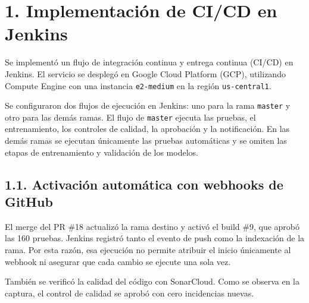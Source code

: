 \section{1. Implementación de CI/CD en Jenkins}

Se implementó un flujo de integración continua y entrega continua (CI/CD) en Jenkins. El servicio se desplegó en Google Cloud Platform (GCP), utilizando Compute Engine con una instancia \texttt{e2-medium} en la región \texttt{us-central1}.



Se configuraron dos flujos de ejecución en Jenkins: uno para la rama \texttt{master} y otro para las demás ramas. El flujo de \texttt{master} ejecuta las pruebas, el entrenamiento, los controles de calidad, la aprobación y la notificación. En las demás ramas se ejecutan únicamente las pruebas automáticas y se omiten las etapas de entrenamiento y validación de los modelos.

\subsection{1.1. Activación automática con webhooks de GitHub}






El merge del PR \#18 actualizó la rama destino y activó el build \#9, que aprobó las 160 pruebas. Jenkins registró tanto el evento de push como la indexación de la rama. Por esta razón, esa ejecución no permite atribuir el inicio únicamente al webhook ni asegurar que cada cambio se ejecute una sola vez.



También se verificó la calidad del código con SonarCloud. Como se observa en la captura, el control de calidad se aprobó con cero incidencias nuevas.


\FloatBarrier


\FloatBarrier

